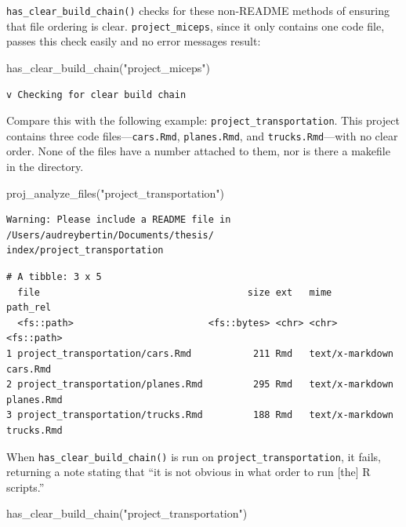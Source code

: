 \documentclass[12pt,twoside]{reedthesis}
\newenvironment{Shaded}{\begin{snugshade}}{\end{snugshade}}
\newcommand{\FunctionTok}[1]{\textcolor[rgb]{0.00,0.00,0.00}{#1}}
\newcommand{\NormalTok}[1]{#1}
\newcommand{\StringTok}[1]{\textcolor[rgb]{0.31,0.60,0.02}{#1}}
\begin{document}
\texttt{has\_clear\_build\_chain()} checks for these non-README methods of ensuring that file ordering is clear. \texttt{project\_miceps}, since it only contains one code file, passes this check easily and no error messages result:
\begin{Shaded}
\begin{Highlighting}[]
\FunctionTok{has\_clear\_build\_chain}\NormalTok{(}\StringTok{"project\_miceps"}\NormalTok{)}
\end{Highlighting}
\end{Shaded}
\begin{verbatim}
v Checking for clear build chain
\end{verbatim}
Compare this with the following example: \texttt{project\_transportation}. This project contains three code files---\texttt{cars.Rmd}, \texttt{planes.Rmd}, and \texttt{trucks.Rmd}---with no clear order. None of the files have a number attached to them, nor is there a makefile in the directory.
\begin{Shaded}
\begin{Highlighting}[]
\FunctionTok{proj\_analyze\_files}\NormalTok{(}\StringTok{"project\_transportation"}\NormalTok{)}
\end{Highlighting}
\end{Shaded}
\begin{verbatim}
Warning: Please include a README file in /Users/audreybertin/Documents/thesis/
index/project_transportation
\end{verbatim}
\begin{verbatim}
# A tibble: 3 x 5
  file                                     size ext   mime            path_rel  
  <fs::path>                        <fs::bytes> <chr> <chr>           <fs::path>
1 project_transportation/cars.Rmd           211 Rmd   text/x-markdown cars.Rmd  
2 project_transportation/planes.Rmd         295 Rmd   text/x-markdown planes.Rmd
3 project_transportation/trucks.Rmd         188 Rmd   text/x-markdown trucks.Rmd
\end{verbatim}
When \texttt{has\_clear\_build\_chain()} is run on \texttt{project\_transportation}, it fails, returning a note stating that ``it is not obvious in what order to run {[}the{]} R scripts.''
\begin{Shaded}
\begin{Highlighting}[]
\FunctionTok{has\_clear\_build\_chain}\NormalTok{(}\StringTok{"project\_transportation"}\NormalTok{)}
\end{Highlighting}
\end{Shaded}
\end{document}

